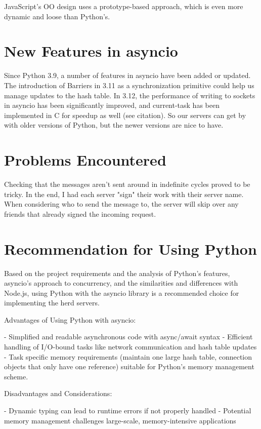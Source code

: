 JavaScript's OO design uses a prototype-based approach, which is even more dynamic and loose than Python's.

\section{New Features in asyncio}

Since Python 3.9, a number of features in asyncio have been added or updated.
The introduction of Barriers in 3.11 as a synchronization primitive could help us manage updates to the hash table. In 3.12, the performance of writing to sockets in asyncio has been significantly improved, and current-task has been implemented in C for speedup as well (see citation). So our servers can get by with older versions of Python, but the newer versions are nice to have.

\section{Problems Encountered}

Checking that the messages aren't sent around in indefinite cycles proved to be tricky. In the end, I had each server "sign" their work with their server name. When considering who to send the message to, the server will skip over any friends that already signed the incoming request.

\section{Recommendation for Using Python}

Based on the project requirements and the analysis of Python's features, asyncio's approach to concurrency, and the similarities and differences with Node.js, using Python with the asyncio library is a recommended choice for implementing the herd servers.

Advantages of Using Python with asyncio:

    - Simplified and readable asynchronous code with async/await syntax
    - Efficient handling of I/O-bound tasks like network communication and hash table updates
    - Task specific memory requirements (maintain one large hash table, connection objects that only have one reference) suitable for Python's memory management scheme.

Disadvantages and Considerations:

    - Dynamic typing can lead to runtime errors if not properly handled
    - Potential memory management challenges large-scale,  memory-intensive applications

